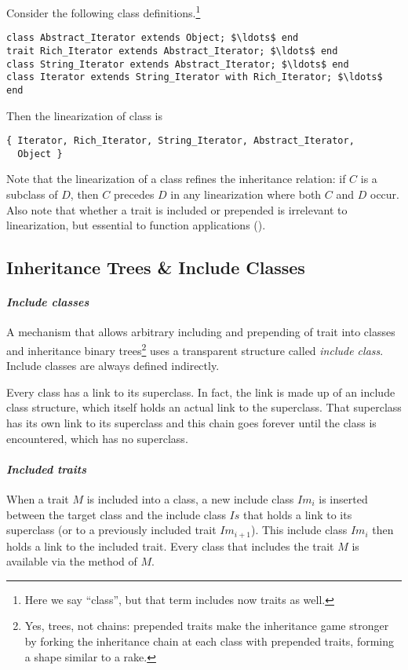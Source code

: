 \example Consider the following class definitions.\footnote{Here we say ``class'', but that term includes now traits as well.}
\begin{lstlisting}
class Abstract_Iterator extends Object; $\ldots$ end
trait Rich_Iterator extends Abstract_Iterator; $\ldots$ end
class String_Iterator extends Abstract_Iterator; $\ldots$ end
class Iterator extends String_Iterator with Rich_Iterator; $\ldots$ end
\end{lstlisting}
Then the linearization of class  is
\begin{lstlisting}
{ Iterator, Rich_Iterator, String_Iterator, Abstract_Iterator, 
  Object }
\end{lstlisting}

Note that the linearization of a class refines the inheritance relation: if $C$ is a subclass of $D$, then $C$ precedes $D$ in any linearization where both $C$ and $D$ occur. Also note that whether a trait is included or prepended is irrelevant to linearization, but essential to function applications ().





\subsection{Inheritance Trees \& Include Classes}
\label{sec:inheritance-trees}
\label{sec:include-classes}

\paragraph{\em Include classes}
A mechanism that allows arbitrary including and prepending of trait into classes and inheritance binary trees\footnote{Yes, trees, not chains: prepended traits make the inheritance game stronger by forking the inheritance chain at each class with prepended traits, forming a shape similar to a rake.} uses a transparent structure called {\em include class}. Include classes are always defined indirectly.

Every class has a link to its superclass. In fact, the link is made up of an include class structure, which itself holds an actual link to the superclass. That superclass has its own link to its superclass and this chain goes forever until the  class is encountered, which has no superclass. 

\paragraph{\em Included traits}
When a trait $M$ is included into a class, a new include class $Im_i$ is inserted between the target class and the include class $Is$ that holds a link to its superclass (or to a previously included trait $Im_{i+1}$). This include class $Im_i$ then holds a link to the included trait. Every class that includes the trait $M$ is available via the  method of $M$. 


